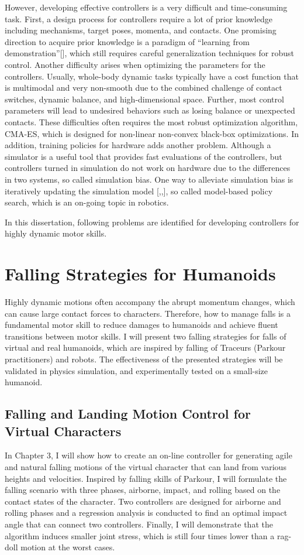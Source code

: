 However, developing effective controllers is a very difficult and
time-consuming task.
First, a design process for controllers require a lot of prior knowledge
including mechanisms, target poses, momenta, and contacts.
One promising direction to acquire prior knowledge is a paradigm of
``learning from demonstration''[], which still requires careful
generalization techniques for robust control.
Another difficulty arises when optimizing the parameters for the controllers.
Usually, whole-body dynamic tasks typically have a cost function that is 
multimodal and very non-smooth due to the combined challenge of contact 
switches, dynamic balance, and high-dimensional space.
Further, most control parameters will lead to undesired behaviors such as
losing balance or unexpected contacts.
These difficulties often requires the most robust optimization algorithm, 
CMA-ES, which is designed for non-linear non-convex black-box
optimizations.
In addition, training policies for hardware adds another problem.
Although a simulator is a useful tool that provides fast evaluations of the
controllers, but controllers turned in simulation do not work on hardware due
to the differences in two systems, so called simulation bias.
One way to alleviate simulation bias is iteratively updating the simulation
model [,,], so called model-based policy search, which is an on-going topic in
robotics.

In this dissertation, following problems are identified for developing 
controllers for highly dynamic motor skills.

\section{Falling Strategies for Humanoids}
Highly dynamic motions often accompany the abrupt momentum changes, which can
cause large contact forces to characters.
Therefore, how to manage falls is a fundamental motor skill to reduce damages
to humanoids and achieve fluent transitions between motor skills.
I will present two falling strategies for falls of virtual and real humanoids,
which are inspired by falling of Traceurs (Parkour practitioners) and robots.
The effectiveness of the presented strategies will be validated in physics
simulation, and experimentally tested on a small-size humanoid.

\subsection{Falling and Landing Motion Control for Virtual Characters}
In Chapter 3, I will show how to create an on-line controller for generating 
agile and natural falling motions of the virtual character that can land from 
various heights and velocities.
Inspired by falling skills of Parkour, I will formulate the falling scenario
with three phases, airborne, impact, and rolling based on the contact states 
of the character.
Two controllers are designed for airborne and rolling phases and a regression
analysis is conducted to find an optimal impact angle that can connect two
controllers.
Finally, I will demonstrate that the algorithm induces smaller joint stress,
which is still four times lower than a rag-doll motion at the worst cases.

